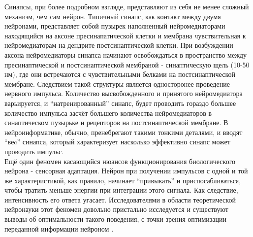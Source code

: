\documentclass[a4paper,10pt]{article}
\begin{document}
\indent Синапсы, при более подробном взгляде, представляют из себя не менее сложный механизм, чем сам нейрон. Типичный синапс, как контакт между двумя нейронами, представляет собой пузырек наполненный нейромедиаторами находящийся на аксоне пресинапатической клетки и мембрана чувствительная к нейромедиаторам на дендрите постсинаптической клетки. При возбуждении аксона нейромедиаторы синапса начинают освобождаться в пространство между пресинаптической и постсинаптической мембраной - синаптическую щель (10-50 нм), где они встречаются с чувствительными белками на постсинаптической мембране. Следствием такой структуры является односторонее проведение нервного импульса. Количество высвобожденного и принятого нейромедиатора варьируется, и ``натренированный'' синапс, будет проводить гораздо большее количество импульса засчёт большего количества нейромедиаторов в синаптическом пузырьке и рецепторов на постсинаптической мембране. В нейроинформатике, обычно, пренебрегают такими тонкими деталями, и вводят ``веc'' синапса, который характеризует насколько эффективно синапс может проводить импульс.\\
\indent Ещё один феномен касающийся нюансов функционирования биологического нейрона - сенсорная адаптация\cite{Phizi}. Нейрон при получении импульсов с одной и той же характеристикой, как правило, начинает ``привыкать'' и приспосабливаться, чтобы тратить меньше энергии при интеграции этого сигнала. Как следствие, интенсивность его ответа угасает. Исследователями в области теоретической нейронауки этот феномен довольно пристально исследуется и существуют выводы об оптимальности такого поведения, с точки зрения оптимизации переданной информации нейроном \cite{Adapt,TripleAdapt}.
\end{document}
